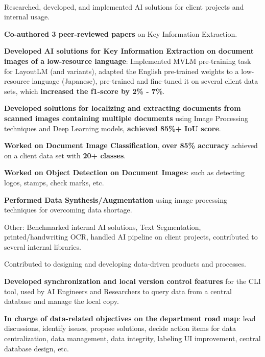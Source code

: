 \\
\begin{xitemize}
    \item Researched, developed, and implemented AI solutions for client projects and internal usage.
    \begin{zitemize}
        \item \textbf{Co-authored 3 peer-reviewed papers} on Key Information Extraction.
        \item \textbf{Developed AI solutions for Key Information Extraction on document images of a low-resource language}: Implemented MVLM pre-training task for LayoutLM (and variants), adapted the English pre-trained weights to a low-resource language (Japanese), pre-trained and fine-tuned it on several client data sets, which \textbf{increased the f1-score by 2\%  - 7\%}.
        \item \textbf{Developed solutions for localizing and extracting documents from scanned images containing multiple documents} using Image Processing techniques and Deep Learning models,  \textbf{achieved 85\%+ IoU score}.
        \item \textbf{Worked on Document Image Classification}, \textbf{over 85\% accuracy} achieved on a client data set with \textbf{20+ classes}.
        \item \textbf{Worked on Object Detection on Document Images}: such as detecting logos, stamps, check marks, etc.
        \item \textbf{Performed Data Synthesis/Augmentation} using image processing techniques for overcoming data shortage.
        \item Other: Benchmarked internal AI solutions, Text Segmentation, printed/handwriting OCR, handled AI pipeline on client projects, contributed to several internal libraries.
    \end{zitemize}
    \item Contributed to designing and developing data-driven products and processes.
    \begin{zitemize}
        \item \textbf{Developed synchronization and local version control features} for the CLI tool, used by AI Engineers and Researchers to query data from a central database and manage the local copy.
        \item \textbf{In charge of data-related objectives on the department road map}: lead discussions, identify issues, propose solutions, decide action items for data centralization, data management, data integrity, labeling UI improvement, central database design, etc.

\end{zitemize}
\end{xitemize}
